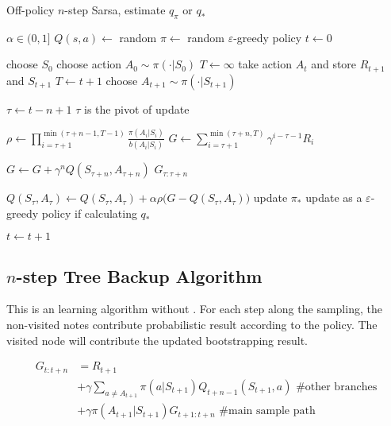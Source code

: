 \begin{algorithm}
	\caption{Off-policy $n$-step Sarsa, estimate $q_\pi$ or $q_*$}\label{algo:nstepoffsarsa}	
	
	\begin{algorithmic}[1]
		\State $ \alpha \in (0,1]$
		\State $Q(s,a) \gets$ random
		\State $\pi \gets$ random $\varepsilon$-greedy policy
		\State $t \gets 0$
		
		\Statex
		
		\Loop
			\State choose $S_0$
			\State choose action $A_0 \sim \pi (\cdot | S_0)$
			\State $T \gets \infty$
					\State take action $A_t$ and store $R_{t+1}$ and $S_{t+1}$
						\State $T \gets t+1$
					\Else
						\State choose $A_{t+1} \sim \pi(\cdot|S_{t+1})$
					\EndIf
				\EndIf
				
				\State $\tau \gets t - n + 1$ \Comment $\tau$ is the pivot of update
				
					\State $\rho \gets \prod\limits_{i=\tau+1}^{\min (\tau+n-1,T-1)} \frac{\pi(A_i|S_i)}{b(A_i|S_i)}$
					\State $G \gets \sum\limits_{i=\tau+1}^{\min (\tau+n,T)} \gamma^{i-\tau-1} R_i$ 					
					
						\State $G \gets G + \gamma^n Q(S_{\tau + n}, A_{\tau + n})$ \Comment $G_{\tau:\tau+n}$
					\EndIf
					
					\State $Q(S_{\tau}, A_{\tau}) \gets Q(S_{\tau}, A_{\tau}) + \alpha \rho \Big(G - Q(S_{\tau}, A_{\tau})\Big)$
					\State update $\pi_*$ \Comment update as a $\varepsilon$-greedy policy if calculating $q_*$
				\EndIf

				\State $t \gets t+1$
			\EndWhile
		\EndLoop
	\end{algorithmic}
\end{algorithm}

\subsection{$n$-step Tree Backup Algorithm}

This is an  learning algorithm without . For each step along the sampling, the non-visited notes contribute probabilistic result according to the policy. The visited node will contribute the updated bootstrapping result.


\begin{equation}
	\begin{split}
		G_{t:t+n}&=R_{t+1}\\
		&+\gamma \sum_{a\neq A_{t+1}} \pi(a|S_{t+1}) Q_{t+n-1}(S_{t+1},a) \text{  \# other branches} \\
		&+ \gamma \pi(A_{t+1}|S_{t+1})G_{t+1:t+n} \text{  \# main sample path}
	\end{split}
\end{equation}


